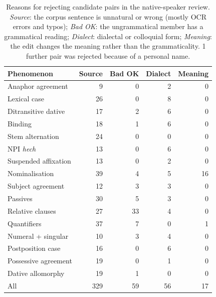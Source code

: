 \begin{table}[t]
\centering\small
\setlength{\tabcolsep}{3.4pt}
\begin{tabular}{@{}lrrrr@{}}
\toprule
Phenomenon & Source & Bad OK & Dialect & Meaning \\
\midrule
Anaphor agreement & 9 & 0 & 2 & 0 \\
Lexical case & 26 & 0 & 8 & 0 \\
Ditransitive dative & 17 & 2 & 6 & 0 \\
Binding & 18 & 1 & 6 & 0 \\
Stem alternation & 24 & 0 & 0 & 0 \\
NPI \textit{hech} & 13 & 0 & 6 & 0 \\
Suspended affixation & 13 & 0 & 2 & 0 \\
Nominalisation & 39 & 4 & 5 & 16 \\
Subject agreement & 12 & 3 & 3 & 0 \\
Passives & 30 & 5 & 3 & 0 \\
Relative clauses & 27 & 33 & 4 & 0 \\
Quantifiers & 37 & 7 & 0 & 1 \\
Numeral + singular & 10 & 3 & 4 & 0 \\
Postposition case & 16 & 0 & 6 & 0 \\
Possessive agreement & 19 & 0 & 1 & 0 \\
Dative allomorphy & 19 & 1 & 0 & 0 \\
\midrule
All & 329 & 59 & 56 & 17 \\
\bottomrule
\end{tabular}
\caption{Reasons for rejecting candidate pairs in the native-speaker review. \emph{Source}: the corpus sentence is unnatural or wrong (mostly OCR errors and typos); \emph{Bad OK}: the ungrammatical member has a grammatical reading; \emph{Dialect}: dialectal or colloquial form; \emph{Meaning}: the edit changes the meaning rather than the grammaticality. 1 further pair was rejected because of a personal name.}
\label{tab:reasons}
\end{table}

